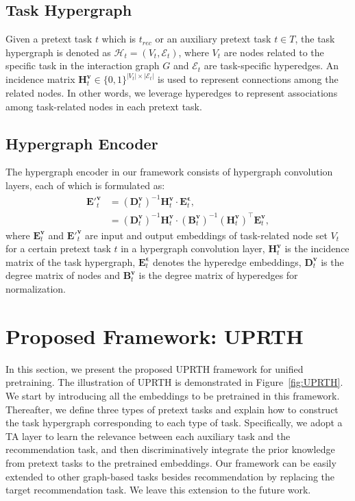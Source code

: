 \subsection{Task Hypergraph}
Given a pretext task $t$ which is $t_{rec}$ or an auxiliary pretext task $t\in T$, the task hypergraph is denoted as $\mathcal{H}_t=(V_t,\mathcal{E}_t)$, where $V_t$ are nodes related to the specific task in the interaction graph $G$ and $\mathcal{E}_t$ are task-specific hyperedges. An incidence matrix $\mathbf{H}^{\mathbf{v}}_{t}\in\{0,1\}^{|V_t|\times|\mathcal{E}_t|}$ is used to represent connections among the related nodes.
In other words, we leverage hyperedges to represent associations among task-related nodes in each pretext task. 

\subsection{Hypergraph Encoder}\label{sec_uprth:hgconv}
The hypergraph encoder in our framework consists of hypergraph convolution layers, each of which is formulated as:
\begin{equation}\label{eq_encoder}
\begin{aligned}
\mathbf{E'}^{\mathbf{v}}_{t}&=(\mathbf{D}^{\mathbf{v}}_{t})^{-1}\mathbf{H}^{\mathbf{v}}_{t}\cdot\mathbf{E}^{\mathbf{\epsilon}}_{t},\\
&=(\mathbf{D}^{\mathbf{v}}_{t})^{-1}\mathbf{H}^{\mathbf{v}}_{t}\cdot(\mathbf{B}^{\mathbf{v}}_{t})^{-1}(\mathbf{H}^{\mathbf{v}}_{t})^\top\mathbf{E}^{\mathbf{v}}_{t},
\end{aligned}
\end{equation}
where $\mathbf{E}^{\mathbf{v}}_{t}$ and $\mathbf{E'}^{\mathbf{v}}_{t}$ are input and output embeddings of task-related node set $V_t$ for a certain pretext task $t$ in a hypergraph convolution layer, $\mathbf{H}^{\mathbf{v}}_{t}$ is the incidence matrix of the task hypergraph, $\mathbf{E}^{\mathbf{\epsilon}}_{t}$ denotes the hyperedge embeddings, $\mathbf{D}^{\mathbf{v}}_{t}$ is the degree matrix of nodes and $\mathbf{B}^{\mathbf{v}}_{t}$ is the degree matrix of hyperedges for normalization.  

\section{Proposed Framework: UPRTH}
In this section, we present the proposed UPRTH framework for unified pretraining. The illustration of UPRTH is demonstrated in Figure~\ref{fig:UPRTH}. We start by introducing all the embeddings to be pretrained in this framework. Thereafter, we define three types of pretext tasks and explain how to construct the task hypergraph corresponding to each type of task. Specifically, we adopt a TA layer to learn the relevance between each auxiliary task and the recommendation task, and then discriminatively integrate the prior knowledge from pretext tasks to the pretrained embeddings. Our framework can be easily extended to other graph-based tasks besides recommendation by replacing the target recommendation task. We leave this extension to the future work.
